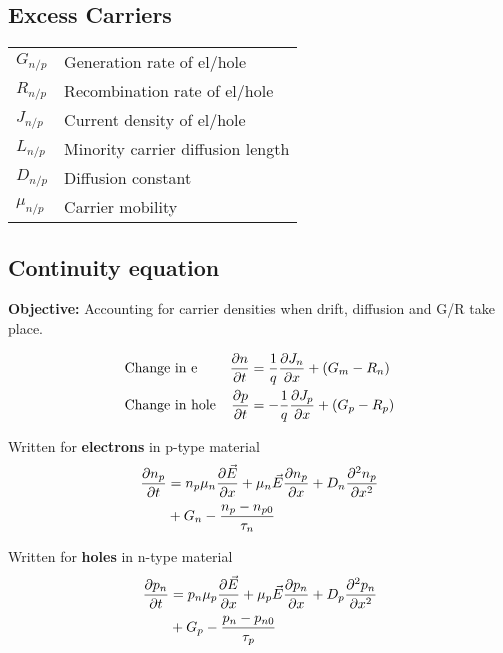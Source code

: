 \documentclass[a4paper, fontsize=8pt, landscape, DIV=1]{scrartcl}
\begin{document}
\begin{multicols*}{4}
  \section{Excess Carriers}
    \begin{tabular}[h]{l l}
      $G_{n/p}$   & Generation rate of el/hole \\
      $R_{n/p}$   & Recombination rate of el/hole \\
      $J_{n/p}$   & Current density of el/hole \\
      $L_{n/p}$   & Minority carrier diffusion length \\
      $D_{n/p}$   & Diffusion constant \\
      $\mu_{n/p}$ & Carrier mobility \\
    \end{tabular}

  \subsection{Continuity equation}
    \textbf{Objective:} Accounting for carrier densities when drift, diffusion and G/R take place.
    
    \begin{align*}
      &\text{Change in e} & \frac{\partial n}{\partial t} &= \frac{1}{q}\frac{\partial J_n}{\partial x}+(G_m-R_n) \\
      &\text{Change in hole} & \frac{\partial p}{\partial t} &= -\frac{1}{q}\frac{\partial J_p}{\partial x}+(G_p-R_p)
    \end{align*}

    Written for \textbf{electrons} in p-type material
    \begin{align*}
      \frac{\partial n_p}{\partial t} &= n_p\mu_n\frac{\partial\vec{E}}{\partial x}+\mu_n\vec{E}\frac{\partial n_p}{\partial x} + D_n\frac{\partial^2n_p}{\partial x^2} \\ &+ G_n - \frac{n_p-n_{p0}}{\tau_n}
    \end{align*}

    Written for \textbf{holes} in n-type material
    \begin{align*}
      \frac{\partial p_n}{\partial t} &= p_n\mu_p\frac{\partial\vec{E}}{\partial x}+\mu_p\vec{E}\frac{\partial p_n}{\partial x} + D_p\frac{\partial^2p_n}{\partial x^2} \\ &+ G_p - \frac{p_n-p_{n0}}{\tau_p}
    \end{align*}


\end{multicols*}
\end{document}
